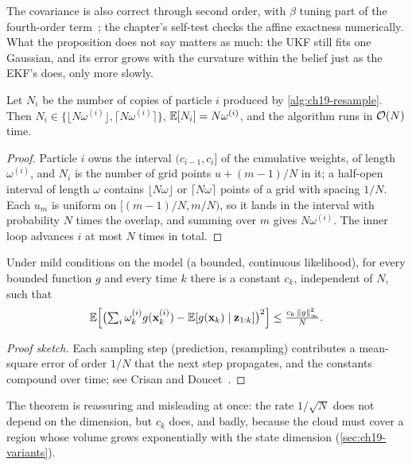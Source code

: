 The covariance is also correct through second order, with $\beta$ tuning
part of the fourth-order term~\cite{julier2004unscented}; the chapter's
self-test checks the affine exactness numerically. What the proposition does
not say matters as much: the UKF still fits one Gaussian, and its error
grows with the curvature within the belief just as the EKF's does, only more
slowly.

\begin{proposition}
\label{thm:ch19-systematic}
Let $N_i$ be the number of copies of particle $i$ produced by
\cref{alg:ch19-resample}. Then $N_i \in \{\lfloor N \omega^{(i)}\rfloor,
\lceil N \omega^{(i)}\rceil\}$, $\mathbb{E}[N_i] = N \omega^{(i)}$, and the algorithm runs in
$\mathcal{O}\!\left(N\right)$ time.
\end{proposition}
\begin{proof}
Particle $i$ owns the interval $(c_{i-1}, c_i]$ of the cumulative weights,
of length $\omega^{(i)}$, and $N_i$ is the number of grid points $u + (m-1)/N$
in it; a half-open interval of length $\omega$ contains $\lfloor N\omega \rfloor$ or
$\lceil N\omega \rceil$ points of a grid with spacing $1/N$. Each $u_m$ is
uniform on $[(m-1)/N, m/N)$, so it lands in the interval with probability
$N$ times the overlap, and summing over $m$ gives $N \omega^{(i)}$. The inner
loop advances $i$ at most $N$ times in total.
\end{proof}

\begin{theorem}
\label{thm:ch19-pf-convergence}
Under mild conditions on the model (a bounded, continuous likelihood), for
every bounded function $g$ and every time $k$ there is a constant $c_k$,
independent of $N$, such that
\[
  \mathbb{E}\Bigl[\bigl(\textstyle\sum_i \omega_k^{(i)} g(\mathbf{x}_k^{(i)}) -
  \mathbb{E}[g(\mathbf{x}_k) \mid \mathbf{z}_{1:k}]\bigr)^2\Bigr] \le \frac{c_k\,\left\lVert g \right\rVert_\infty^2}{N}.
\]
\end{theorem}
\begin{proof}[Proof sketch]
Each sampling step (prediction, resampling) contributes a mean-square error
of order $1/N$ that the next step propagates, and the constants compound
over time; see Crisan and Doucet~\cite{crisan2002survey}.
\end{proof}

The theorem is reassuring and misleading at once: the rate $1/\sqrt{N}$
does not depend on the dimension, but $c_k$ does, and badly, because the
cloud must cover a region whose volume grows exponentially with the state
dimension (\cref{sec:ch19-variants}).

